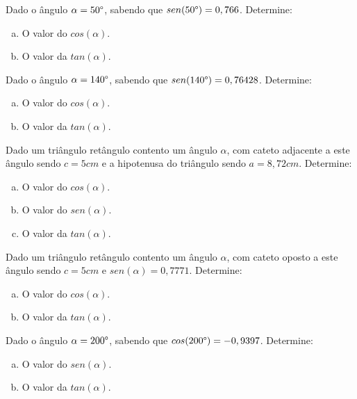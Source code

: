  \begin{exer}
 Dado o ângulo $\alpha= 50\degree$, sabendo que $sen(50\degree)= 0,766$. Determine:
 \begin{enumerate}[a)]
 \item O valor do $cos(\alpha)$.
 \item O valor da $tan(\alpha)$.
 \end{enumerate}
 \end{exer}
 
 \begin{exer}
 Dado o ângulo $\alpha= 140\degree$, sabendo que $sen(140\degree)= 0,76428$. Determine:
 \begin{enumerate}[a)]
 \item O valor do $cos(\alpha)$.
 \item O valor da $tan(\alpha)$.
 \end{enumerate}
 \end{exer}
 
 \begin{exer}
 Dado um triângulo retângulo contento um ângulo $\alpha$, com cateto adjacente a este ângulo sendo $c= 5 cm$ e a hipotenusa do triângulo sendo $a= 8,72 cm$. Determine:
 \begin{enumerate}[a)]
 \item O valor do $cos(\alpha)$.
 \item O valor do $sen(\alpha)$.
 \item O valor da $tan(\alpha)$.
 \end{enumerate}
 \end{exer}
 
 \begin{exer}
 Dado um triângulo retângulo contento um ângulo $\alpha$, com cateto oposto a este ângulo sendo $c= 5 cm$ e $sen(\alpha)= 0,7771$. Determine:
 \begin{enumerate}[a)]
 \item O valor do $cos(\alpha)$.
 \item O valor da $tan(\alpha)$.
 \end{enumerate}
 \end{exer}
 
 \begin{exer}
 Dado o ângulo $\alpha= 200\degree$, sabendo que $cos(200\degree)= -0,9397$. Determine:
 \begin{enumerate}[a)]
 \item O valor do $sen(\alpha)$.
 \item O valor da $tan(\alpha)$.
 \end{enumerate}
 \end{exer}
 
